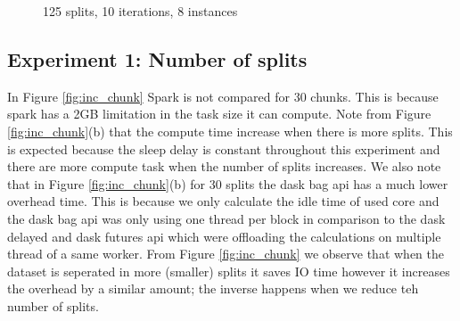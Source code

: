 \documentclass[11pt,a4paper]{article}
\begin{document}
\begin{figure}[htp]
    \centering
    
    \caption{125 splits, 10 iterations, 8 instances}
    \label{fig:inc_sleep}
\end{figure}


\subsection{Experiment 1: Number of splits}
In Figure \ref{fig:inc_chunk} Spark is not compared for 30 chunks. This is because
spark has a 2GB limitation in the task size it can compute. Note from Figure
\ref{fig:inc_chunk}(b) that the compute time increase when there is more splits.
This is expected because the sleep delay is constant throughout this experiment and
there are more compute task when the number of splits increases. We also note that in
Figure \ref{fig:inc_chunk}(b) for 30 splits the dask bag api has a much lower
overhead time. This is because we only calculate the idle time of used core and the
dask bag api was only using one thread per block in comparison to the dask delayed
and dask futures api which were offloading the calculations on multiple thread of a
same worker. From Figure \ref{fig:inc_chunk} we observe that when the dataset is
seperated in more (smaller) splits it saves IO time however it increases the overhead
by a similar amount; the inverse happens when we reduce teh number of splits.
\end{document}

